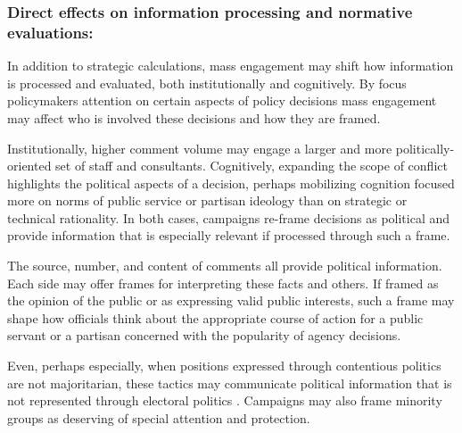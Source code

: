 \subsubsection{Direct effects on information processing and normative evaluations:}
In addition to strategic calculations, mass engagement may shift how information is processed and evaluated, both institutionally and cognitively. %
By focus policymakers attention on certain aspects of policy decisions mass engagement may affect who is involved these decisions and how they are framed.

Institutionally, higher comment volume may engage a larger and more politically-oriented set of staff and consultants. Cognitively, expanding the scope of conflict highlights the political aspects of a decision, perhaps mobilizing cognition focused more on norms of public service or partisan ideology than on strategic or technical rationality. In both cases, campaigns re-frame decisions as political and provide information that is especially relevant if processed through such a frame.

The source, number, and content of comments all provide political information. Each side may offer frames for interpreting these facts and others. If 
framed as the opinion of the public or as expressing valid public interests, such a frame may shape how officials think about the appropriate course of action for a public servant or a partisan concerned with the popularity of agency decisions.  

Even, perhaps especially, when positions expressed through contentious politics
are not majoritarian, these tactics may communicate political information that is not represented through electoral politics \citep{Gillion2012, Gillion2013}. 
Campaigns may also frame minority groups as deserving of special attention and protection.

